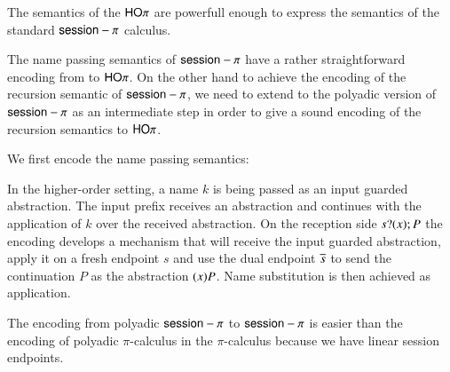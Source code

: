 The semantics of the $\mathsf{HO}\pi$ are powerfull enough to
express the semantics of the standard $\mathsf{session}-\pi$ calculus.

The name passing semantics of $\mathsf{session}-\pi$ have a rather straightforward
encoding from to $\mathsf{HO}\pi$.
On the other hand to achieve the encoding of the recursion semantic
of $\mathsf{session}-\pi$, we need to extend
to the polyadic version of $\mathsf{session}-\pi$ as an intermediate step in order
to give a sound encoding of the recursion semantics to $\mathsf{HO}\pi$.

We first encode the name passing semantics:


In the higher-order setting, a name $k$ is being passed as an input
guarded abstraction. The input prefix receives an abstraction and
continues with the application of $k$ over the received abstraction.
On the reception side $s ? (x) ; P$ 
the encoding develops a mechanism that will receive
the input guarded abstraction, apply it on a fresh endpoint $s$ and use
the dual endpoint $\overline{s}$ to send the continuation $P$ as the abstraction
$(x)P$. Name substitution is then achieved as application.

The encoding from polyadic $\mathsf{session}-\pi$ to $\mathsf{session}-\pi$ is easier than the
encoding of polyadic $\pi$-calculus in the $\pi$-calculus because
we have linear session endpoints.


